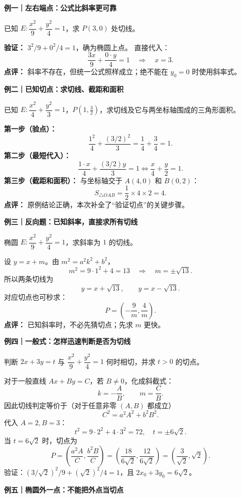 \begin{examplebox}
\textbf{\textcolor{CExample}{例一｜左右端点：公式比斜率更可靠}}

已知 $E:\dfrac{x^2}{9}+\dfrac{y^2}{4}=1$，求 $P(3,0)$ 处切线。

\textbf{验证：} $3^2/9+0^2/4=1$，确为椭圆上点。
直接代入：
\[
 \frac{3x}{9}+\frac{0\cdot y}{4}=1
 \quad\Longrightarrow\quad\boxed{x=3}.
\]
\textbf{点评：} 斜率不存在，但统一公式照样成立；绝不能在 $y_0=0$ 时使用斜率式。

\medskip
\textbf{\textcolor{CExample}{例二｜已知切点：求切线、截距和面积}}

已知 $E:\dfrac{x^2}{4}+\dfrac{y^2}{3}=1$，$P(1,\tfrac32)$，求切线及它与两坐标轴围成的三角形面积。

\textbf{第一步（验点）：}
\[
 \frac{1^2}{4}+\frac{(3/2)^2}{3}
 =\frac14+\frac34=1.
\]
\textbf{第二步（最短代入）：}
\[
 \frac{1\cdot x}{4}+\frac{(3/2)y}{3}=1
 \iff\boxed{\frac{x}{4}+\frac{y}{2}=1}.
\]
\textbf{第三步（截距和面积）：} 与坐标轴交于 $A(4,0)$ 和 $B(0,2)$：
\[
 S_{\triangle OAB}=\frac12\times 4\times 2=\boxed4.
\]
\textbf{点评：} 原例结论正确，本次补全了“验证切点”的关键步骤。

\medskip
\textbf{\textcolor{CExample}{例三｜反向题：已知斜率，直接求所有切线}}

椭圆 $E:\dfrac{x^2}{9}+\dfrac{y^2}{4}=1$，求斜率为 $1$ 的切线。

设 $y=x+m$。由 $m^2=a^2k^2+b^2$，
\[
 m^2=9\cdot1^2+4=13
 \quad\Longrightarrow\quad m=\pm\sqrt{13}.
\]
所以两条切线为
\[
 \boxed{y=x+\sqrt{13}},\qquad
 \boxed{y=x-\sqrt{13}}.
\]
对应切点也可秒求：
\[
 P=\left(-\frac{9}{m},\frac4m\right).
\]
\textbf{点评：} 已知斜率时，不必先猜切点；先求 $m$ 更快。

\medskip
\textbf{\textcolor{CExample}{例四｜一般式：怎样迅速判断是否为切线}}

判断 $2x+3y=t$ 与 $\dfrac{x^2}{9}+\dfrac{y^2}{4}=1$ 何时相切，并求 $t>0$ 的切点。

对于一般直线 $Ax+By=C$，若 $B\ne0$，化成斜截式：
\[
 k=-\frac AB,\qquad m=\frac CB.
\]
因此切线判定等价于（对于任意非零 $(A,B)$ 都成立）
\[
 \boxed{C^2=a^2A^2+b^2B^2}.
\]
代入 $A=2,B=3$：
\[
 t^2=9\cdot2^2+4\cdot3^2=72,
 \quad\boxed{t=\pm6\sqrt2}.
\]
当 $t=6\sqrt2$ 时，切点为
\[
 P=\left(\frac{a^2A}{C},\frac{b^2B}{C}\right)
 =\left(\frac{18}{6\sqrt2},\frac{12}{6\sqrt2}\right)
 =\boxed{\left(\frac3{\sqrt2},\sqrt2\right)}.
\]
验证：$(3/\sqrt2)^2/9+(\sqrt2)^2/4=1$，且 $2x_0+3y_0=6\sqrt2$。

\medskip
\textbf{\textcolor{CExample}{例五｜椭圆外一点：不能把外点当切点}}


\end{examplebox}
